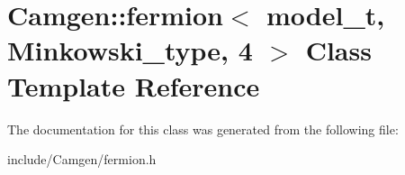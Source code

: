 \hypertarget{a00222}{}\section{Camgen\+:\+:fermion$<$ model\+\_\+t, Minkowski\+\_\+type, 4 $>$ Class Template Reference}
\label{a00222}


The documentation for this class was generated from the following file\+:\begin{DoxyCompactItemize}
\item 
include/\+Camgen/fermion.\+h\end{DoxyCompactItemize}
